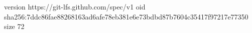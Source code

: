 version https://git-lfs.github.com/spec/v1
oid sha256:7ddc86fae88268163ad6afe78eb381e6e73bdbd87b7604c35417f97217e77350
size 72
